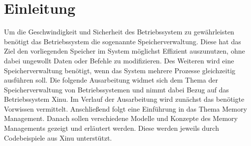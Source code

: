 \section{Einleitung}
\label{sec:Einleitung}
Um die Geschwindigkeit und Sicherheit des Betriebssystem zu gewährleisten benötigt das Betriebssystem die sogenannte Speicherverwaltung. Diese hat das Ziel den vorliegenden Speicher im System möglichst Effizient auszunutzen, ohne dabei ungewollt Daten oder Befehle zu modifizieren. Des Weiteren wird eine Speicherverwaltung benötigt, wenn das System mehrere Prozesse gleichzeitig ausführen soll. Die folgende Ausarbeitung widmet sich dem Thema der Speicherverwaltung von Betriebssystemen und nimmt dabei Bezug auf das Betriebssystem Xinu.
Im Verlauf der Ausarbeitung wird zunächst das benötigte Vorwissen vermittelt. Anschließend folgt eine Einführung in das Thema Memory Management. Danach sollen verschiedene Modelle und Konzepte des Memory Managements gezeigt und erläutert werden. Diese werden jeweils durch Codebeispiele aus Xinu unterstützt.
